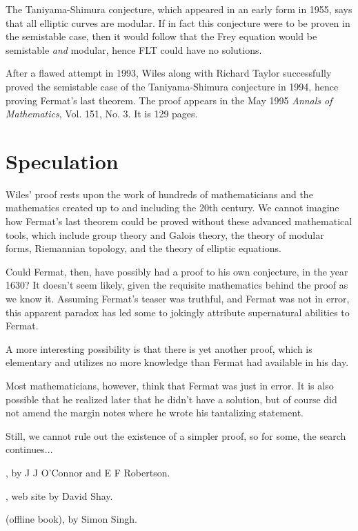 \documentclass{article}
\begin{document}
The Taniyama-Shimura conjecture, which appeared in an early form in 1955, says that all elliptic curves are modular.  If in fact this conjecture were to be proven in the semistable case, then it would follow that the Frey equation would be semistable \emph{and} modular, hence FLT could have no solutions. 

After a flawed attempt in 1993, Wiles along with Richard Taylor successfully proved the semistable case of the Taniyama-Shimura conjecture in 1994, hence proving Fermat's last theorem.  The proof appears in the May 1995 {\it Annals of Mathematics}, Vol. 151, No. 3. It is 129 pages.

\section{Speculation}

Wiles' proof rests upon the work of hundreds of mathematicians and the mathematics created up to and including the 20th century.  We cannot imagine how Fermat's last theorem could be proved without these advanced mathematical tools, which include group theory and Galois theory, the theory of modular forms, Riemannian topology, and the theory of elliptic equations.  

Could Fermat, then, have possibly had a proof to his own conjecture, in the year 1630?  It doesn't seem likely, given the requisite mathematics behind the proof as we know it.  Assuming Fermat's teaser was truthful, and Fermat was not in error, this apparent paradox has led some to jokingly attribute supernatural abilities to Fermat.

A more interesting possibility is that there is yet another proof, which is elementary and utilizes no more knowledge than Fermat had available in his day.          

Most mathematicians, however, think that Fermat was just in error.  It is also possible that he realized later that he didn't have a solution, but of course did not amend the margin notes where he wrote his tantalizing statement.  

Still, we cannot rule out the existence of a simpler proof, so for some, the search continues...

\begin{thebibliography}{3}

 ,  by J J O'Connor and E F Robertson.

 , web site by David Shay.

  (offline book), by Simon Singh.

\end{thebibliography}
\end{document}
